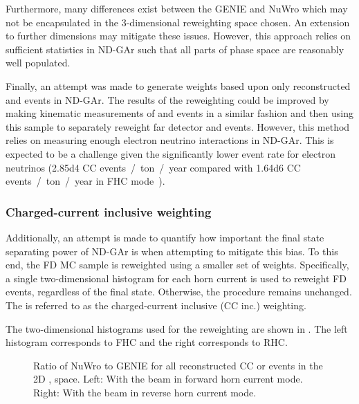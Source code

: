 Furthermore, many differences exist between the GENIE and NuWro which may not be encapsulated in the 3-dimensional reweighting space chosen.
An extension to further dimensions may mitigate these issues.
However, this approach relies on sufficient statistics in ND-GAr such that all parts of phase space are reasonably well populated.

Finally, an attempt was made to generate weights based upon only reconstructed \numu and \anumu events in ND-GAr.
The results of the reweighting could be improved by making kinematic measurements of \nue and \anue events in a similar fashion and then using this sample to separately reweight far detector \nue and \anue events.
However, this method relies on measuring enough electron neutrino interactions in ND-GAr.
This is expected to be a challenge given the significantly lower event rate for electron neutrinos (\num{2.85d4} CC events~/~ton~/~year compared with \num{1.64d6} \numu CC events~/~ton~/~year in FHC mode~\cite{ndCdr}).

\subsubsection{Charged-current inclusive weighting}

Additionally, an attempt is made to quantify how important the final state separating power of ND-GAr is when attempting to mitigate this bias.
To this end, the FD MC sample is reweighted using a smaller set of weights.
Specifically, a single two-dimensional histogram for each horn current is used to reweight FD events, regardless of the final state. 
Otherwise, the procedure remains unchanged.
The is referred to as the charged-current inclusive (CC inc.) weighting.

The two-dimensional histograms used for the reweighting are shown in . 
The left histogram corresponds to FHC and the right corresponds to RHC.

\begin{figure}[h]
	\begin{minipage}[t]{.5\linewidth}
		\begin{adjustbox}{max totalsize=\linewidth, center}
			
		\end{adjustbox}
	\end{minipage}
	\hfill
	\begin{minipage}[t]{.5\linewidth}
		\begin{adjustbox}{max totalsize=\linewidth, center}
			
		\end{adjustbox}
	\end{minipage}
	\caption[CC inclusive ratio of NuWro to GENIE in \evis and \pvis for FHC and RHC.]{Ratio of NuWro to GENIE for all reconstructed CC \numu or \anumu events in the 2D \evis, \pvis space. Left: With the beam in forward horn current mode. Right: With the beam in reverse horn current mode.}
	\label{fig:ccIncWeightingHists}
\end{figure}

